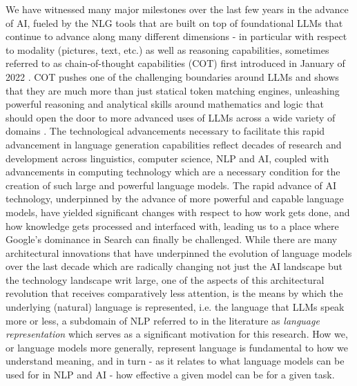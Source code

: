 \documentclass[final]{clv2025}
\begin{document}
We have witnessed many major milestones over the last few years in the advance of AI, fueled by the NLG tools that are built on top of foundational LLMs that continue to advance along many different dimensions - in particular with respect to modality (pictures, text, etc.) as well as reasoning capabilities, sometimes referred to as chain-of-thought capabilities (COT) first introduced in January of 2022 \cite{articlewei}. COT pushes one of the challenging boundaries around LLMs and shows that they are much more than just statical token matching engines, unleashing powerful reasoning and analytical skills around mathematics and logic that should open the door to more advanced uses of LLMs across a wide variety of domains \cite{xu2025towards}. The technological advancements necessary to facilitate this rapid advancement in language generation capabilities reflect decades of research and development across linguistics, computer science, NLP and AI, coupled with advancements in computing technology which are a necessary condition for the creation of such large and powerful language models. The rapid advance of AI technology, underpinned by the advance of more powerful and capable language models, have yielded significant changes with respect to how work gets done, and how knowledge gets processed and interfaced with, leading us to a place where Google's dominance in Search can finally be challenged. While there are many architectural innovations that have underpinned the evolution of language models over the last decade which are radically changing not just the AI landscape but the technology landscape writ large, one of the aspects of this architectural revolution that receives comparatively less attention, is the means by which the underlying (natural) language is represented, i.e. the language that LLMs speak more or less, a subdomain of NLP referred to in the literature as \textit{language representation} which serves as a significant motivation for this research. How we, or language models more generally, represent language is fundamental to how we understand meaning, and in turn - as it relates to what language models can be used for in NLP and AI - how effective a given model can be for a given task.
\end{document}
